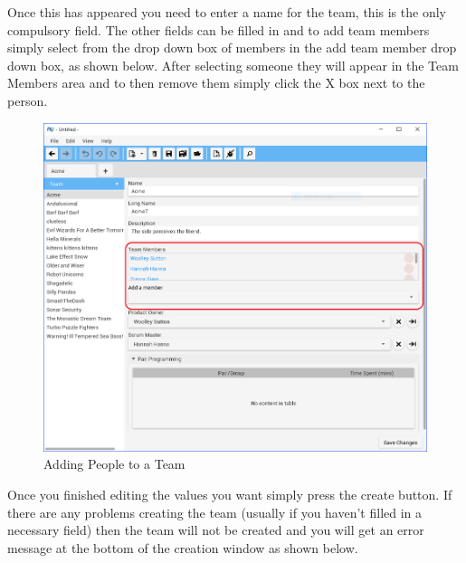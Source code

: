 Once this has appeared you need to enter a name for the team, this is the only compulsory field. The other fields can be filled in and to add team members simply select from the drop down box of members in the add team member drop down box, as shown below. After selecting someone they will appear in the Team Members area and to then remove them simply click the X box next to the person.

\begin{figure}[H]
\centering
\includegraphics[width=\textwidth]{images/screenshots/teams2.PNG}
\caption{Adding People to a Team}
\label{fig:new_project}
\end{figure}

Once you finished editing the values you want simply press the create button. If there are any problems creating the team (usually if you haven't filled in a necessary field) then the team will not be created and you will get an error message at the bottom of the creation window as shown below.

